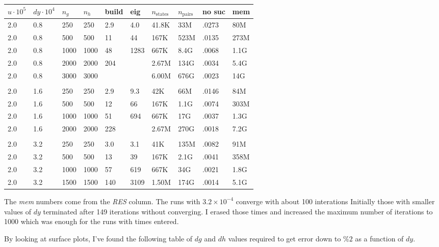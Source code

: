 \documentclass[]{article}
\begin{document}
\begin{tabular}{|l|l|l|l|l|l|l|l|l|l|}
  \hline
  $u\cdot 10^5$ & $dy\cdot 10^4$ & $n_g$ & $n_h$ & build & eig & $n_{\text{states}}$ & 
  $n_{\text{pairs}}$ & no suc & mem \\
  \hline
  2.0 & 0.8 &  250 &  250 & 2.9 &   4.0& 41.8K & 33M  & .0273 &  80M \\
  2.0 & 0.8 &  500 &  500 & 11  &   44 & 167K  & 523M & .0135 & 273M \\
  2.0 & 0.8 & 1000 & 1000 & 48  & 1283 & 667K  & 8.4G & .0068 & 1.1G \\
  2.0 & 0.8 & 2000 & 2000 & 204 &      & 2.67M & 134G & .0034 & 5.4G \\
  2.0 & 0.8 & 3000 & 3000 &     &      & 6.00M & 676G & .0023 & 14G  \\
      &     &      &      &     &      &       &      &       &      \\
  2.0 & 1.6 & 250  & 250  & 2.9 & 9.3  & 42K   &  66M & .0146 &  84M \\
  2.0 & 1.6 & 500  & 500  & 12  & 66   & 167K  & 1.1G & .0074 & 303M \\
  2.0 & 1.6 & 1000 & 1000 & 51  & 694  & 667K  &  17G & .0037 & 1.3G \\
  2.0 & 1.6 & 2000 & 2000 & 228 &      & 2.67M & 270G & .0018 & 7.2G \\
      &     &      &      &     &      &       &      &       &      \\
  2.0 & 3.2 & 250  & 250  & 3.0 & 3.1  & 41K   & 135M & .0082 &  91M \\
  2.0 & 3.2 & 500  & 500  & 13  & 39   & 167K  & 2.1G & .0041 & 358M \\
  2.0 & 3.2 & 1000 & 1000 & 57  & 619  & 667K  & 34G  & .0021 & 1.8G \\
  2.0 & 3.2 & 1500 & 1500 & 140 & 3109 & 1.50M & 174G & .0014 & 5.1G \\
  \hline
\end{tabular}
The \emph{mem} numbers come from the \emph{RES} column.  The runs with
$3.2\times 10^{-4}$ converge with about 100 interations Initially
those with smaller values of $dy$ terminated after 149 iterations
without converging.  I erased those times and increased the maximum
number of iterations to 1000 which was enough for the runs with times
entered.

By looking at surface plots, I've found the following table of $dg$
and $dh$ values required to get error down to $\%2$ as a function of
$dy$.
\end{document}
